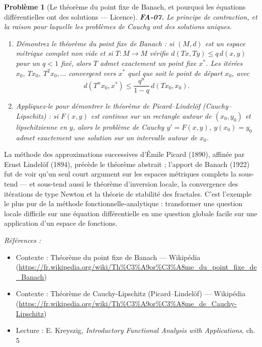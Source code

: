 \documentclass[11pt]{article}
\newtheorem{problem}{Problème}
\newenvironment{refs}{\par\small\noindent\emph{Références :}\begin{itemize}\setlength\itemsep{0pt}}{\end{itemize}\normalsize}
\begin{document}
\bigskip

\begin{problem}[{Le théorème du point fixe de Banach, et pourquoi les équations différentielles ont des solutions --- Licence}]
\textbf{FA-07.} Le principe de contraction, et la raison pour laquelle les problèmes de Cauchy ont
des solutions uniques.
\begin{enumerate}
\item[(a)] Démontrez le théorème du point fixe de Banach : si $ (M, d) $ est un espace métrique complet non
vide et si $ T : M \to M $ vérifie $ d(Tx, Ty) \le q\,d(x, y) $ pour un $ q < 1 $ fixé,
alors $ T $ admet exactement un point fixe $ x^{*} $. Les itérées
$ x_0,\ Tx_0,\ T^2x_0, \dots $ convergent vers $ x^{*} $ quel que soit le point de départ
$ x_0 $, avec
\[ d(T^n x_0, x^{*}) \le \frac{q^n}{1-q}\, d(Tx_0, x_0) . \]
\item[(b)] Appliquez-le pour démontrer le théorème de Picard--Lindelöf (Cauchy--Lipschitz) : si $ F(x, y) $
est continue sur un rectangle autour de $ (x_0, y_0) $ et lipschitzienne en $ y $, alors le
problème de Cauchy $ y' = F(x, y) $, $ y(x_0) = y_0 $ admet exactement une solution sur un
intervalle autour de $ x_0 $.
\end{enumerate}

\end{problem}

\noindent La méthode des approximations successives d'Émile Picard (1890), affinée par Ernst
Lindelöf (1894), précède le théorème abstrait ; l'apport de Banach (1922) fut de voir qu'un seul court
argument sur les espaces métriques complets la sous-tend --- et sous-tend aussi le théorème d'inversion
locale, la convergence des itérations de type Newton et la théorie de stabilité des fractales. C'est
l'exemple le plus pur de la méthode fonctionnelle-analytique : transformer une question locale
difficile sur une équation différentielle en une question globale facile sur une application d'un
espace de fonctions.

\begin{refs}
\item Contexte : Théorème du point fixe de Banach --- Wikipédia (\url{https://fr.wikipedia.org/wiki/Th%C3%A9or%C3%A8me_du_point_fixe_de_Banach})
\item Contexte : Théorème de Cauchy-Lipschitz (Picard--Lindelöf) --- Wikipédia (\url{https://fr.wikipedia.org/wiki/Th%C3%A9or%C3%A8me_de_Cauchy-Lipschitz})
\item Lecture : E. Kreyszig, \textit{Introductory Functional Analysis with Applications}, ch. 5
\end{refs}
\end{document}
